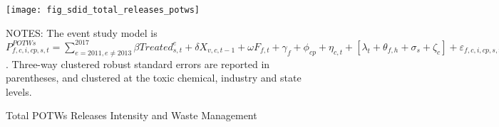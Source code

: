 \begin{figure}[H]
    \centering
    \texttt{[image: fig\_sdid\_total\_releases\_potws]}
    \caption{Total POTWs Releases Intensity and Waste Management}
    \label{fig:baseline-potws-total-releases-intensity}
    \begin{minipage}{\columnwidth}
        \vspace{0.05in}
        \tiny NOTES: The event study model is $P_{f,c,i,cp,s,t}^{POTWs} = \sum_{{e = 2011},{e \neq 2013}}^{2017} \beta Treated_{s,t}^e + \delta X_{v,c,t-1} + \omega F_{f,t} + \gamma_{f} + \phi_{cp} + \eta_{c,t} + \left[\lambda_{t} + \theta_{f,h} + \sigma_{s} + \zeta_{c} \right] + \varepsilon_{f,c,i,cp,s,t}$. Three-way clustered robust standard errors are reported in parentheses, and clustered at the toxic chemical, industry and state levels.
    \end{minipage}
\end{figure}